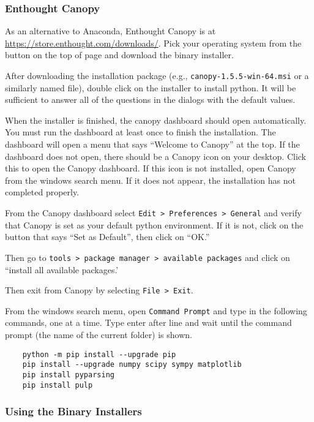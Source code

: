 \clearpage 

\subsubsection{Enthought Canopy}

As an alternative to Anaconda, Enthought Canopy is at \href{https://store.enthought.com/downloads/}{https://store.enthought.com/downloads/}. Pick your operating system from the button on the top of page and download the binary installer. 

After downloading the installation package (e.g., {\tt canopy-1.5.5-win-64.msi} or a similarly named file), double click on the installer to install python. It will be sufficient to answer all of the questions in the dialogs with the default values. 

When the installer is finished, the canopy dashboard should open automatically. You must run the dashboard at least once to finish the installation. The dashboard will open a menu that says ``Welcome to Canopy'' at the top. If the dashboard does not open, there should be a Canopy icon on your desktop. Click this to open the Canopy dashboard. If this icon is not installed, open Canopy from the windows search menu. If it does not appear, the installation has not completed properly.

From the Canopy dashboard select {\tt Edit > Preferences > General} and verify that Canopy is set as your default python environment. If it is not, click on the button that says ``Set as Default'', then click on ``OK.'' 

Then go to {\tt tools > package manager > available packages} and click on ``install all available packages.'

Then exit from Canopy by selecting {\tt File > Exit}. 

From the windows search menu, open {\tt Command Prompt} and type in the following commands, one at a time. Type enter after line and wait until the command prompt (the name of the current folder)  is shown. 

\begin{lstlisting}
    python -m pip install --upgrade pip
    pip install --upgrade numpy scipy sympy matplotlib
    pip install pyparsing
    pip install pulp
\end{lstlisting}

\subsubsection{Using the Binary Installers}


